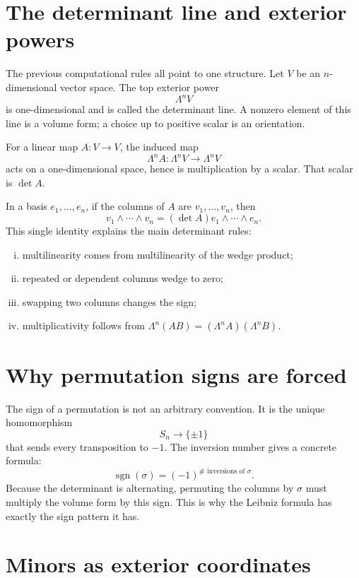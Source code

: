 \section{The determinant line and exterior powers}

The previous computational rules all point to one structure.  Let \(V\) be an \(n\)-dimensional vector space.  The top exterior power
\[
  \Lambda^n V
\]
is one-dimensional and is called the determinant line.  A nonzero element of this line is a volume form; a choice up to positive scalar is an orientation.

\begin{definition}
For a linear map \(A:V\to V\), the induced map
\[
  \Lambda^n A:\Lambda^n V\to\Lambda^n V
\]
acts on a one-dimensional space, hence is multiplication by a scalar.  That scalar is \(\det A\).
\end{definition}

In a basis \(e_1,\ldots,e_n\), if the columns of \(A\) are \(v_1,\ldots,v_n\), then
\[
  v_1\wedge\cdots\wedge v_n
  =(\det A)e_1\wedge\cdots\wedge e_n.
\]
This single identity explains the main determinant rules:
\begin{enumerate}[(i)]
  \item multilinearity comes from multilinearity of the wedge product;
  \item repeated or dependent columns wedge to zero;
  \item swapping two columns changes the sign;
  \item multiplicativity follows from \(\Lambda^n(AB)=(\Lambda^n A)(\Lambda^n B)\).
\end{enumerate}

\section{Why permutation signs are forced}

The sign of a permutation is not an arbitrary convention.  It is the unique homomorphism
\[
  S_n\longrightarrow \{\pm1\}
\]
that sends every transposition to \(-1\).  The inversion number gives a concrete formula:
\[
  \operatorname{sgn}(\sigma)=(-1)^{\#\text{ inversions of }\sigma}.
\]
Because the determinant is alternating, permuting the columns by \(\sigma\) must multiply the volume form by this sign.  This is why the Leibniz formula has exactly the sign pattern it has.

\section{Minors as exterior coordinates}


